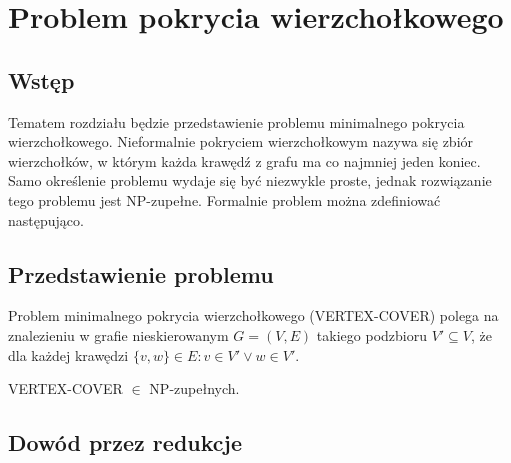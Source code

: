 \chapter{Problem pokrycia wierzchołkowego}

\section{Wstęp}
	
Tematem rozdziału będzie przedstawienie problemu minimalnego pokrycia wierzchołkowego. Nieformalnie pokryciem wierzchołkowym nazywa się zbiór wierzchołków, w którym każda krawędź z grafu ma co najmniej jeden koniec. Samo określenie problemu wydaje się być niezwykle proste, jednak rozwiązanie tego problemu jest NP-zupełne. Formalnie problem można zdefiniować następująco.

\section{Przedstawienie problemu}

Problem minimalnego pokrycia wierzchołkowego (VERTEX-COVER) polega na znalezieniu w grafie nieskierowanym $G=(V,E)$ takiego podzbioru  $V' \subseteq V$, że dla każdej krawędzi $\{v,w\} \in E: v \in V' \lor w \in V'$.

\begin{twr}
VERTEX-COVER $\in$ NP-zupełnych.
\end{twr}

\section{Dowód przez redukcje}


